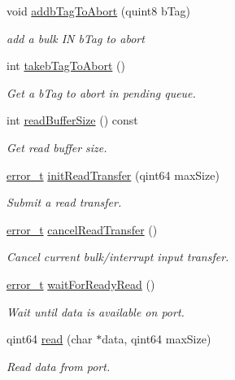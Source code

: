 \begin{DoxyCompactItemize}
void \hyperlink{classmdt_usb_port_a9f4f09dac3f09b1766072cd9c1292ab1}{addbTagToAbort} (quint8 bTag)
\begin{DoxyCompactList}\small\item\em add a bulk IN bTag to abort \end{DoxyCompactList}\item 
int \hyperlink{classmdt_usb_port_a43e3102b004f213ecc01b17f31607957}{takebTagToAbort} ()
\begin{DoxyCompactList}\small\item\em Get a bTag to abort in pending queue. \end{DoxyCompactList}\item 
int \hyperlink{classmdt_usb_port_af546a031ed8621fee1d5e9498cbcd174}{readBufferSize} () const 
\begin{DoxyCompactList}\small\item\em Get read buffer size. \end{DoxyCompactList}\item 
\hyperlink{classmdt_abstract_port_ad4121bb930c95887e77f8bafa065a85e}{error\_\-t} \hyperlink{classmdt_usb_port_a5e380852b8726f71e8558c86cba5bd1f}{initReadTransfer} (qint64 maxSize)
\begin{DoxyCompactList}\small\item\em Submit a read transfer. \end{DoxyCompactList}\item 
\hyperlink{classmdt_abstract_port_ad4121bb930c95887e77f8bafa065a85e}{error\_\-t} \hyperlink{classmdt_usb_port_a3570b708f9f51408e4bbf2f61cc8c881}{cancelReadTransfer} ()
\begin{DoxyCompactList}\small\item\em Cancel current bulk/interrupt input transfer. \end{DoxyCompactList}\item 
\hyperlink{classmdt_abstract_port_ad4121bb930c95887e77f8bafa065a85e}{error\_\-t} \hyperlink{classmdt_usb_port_ab8ddd4ebee603ac381e8da0383a61e36}{waitForReadyRead} ()
\begin{DoxyCompactList}\small\item\em Wait until data is available on port. \end{DoxyCompactList}\item 
qint64 \hyperlink{classmdt_usb_port_abce257345c8af47494215cd7ee75f82d}{read} (char $\ast$data, qint64 maxSize)
\begin{DoxyCompactList}\small\item\em Read data from port. \end{DoxyCompactList}\item 

\end{DoxyCompactItemize}
